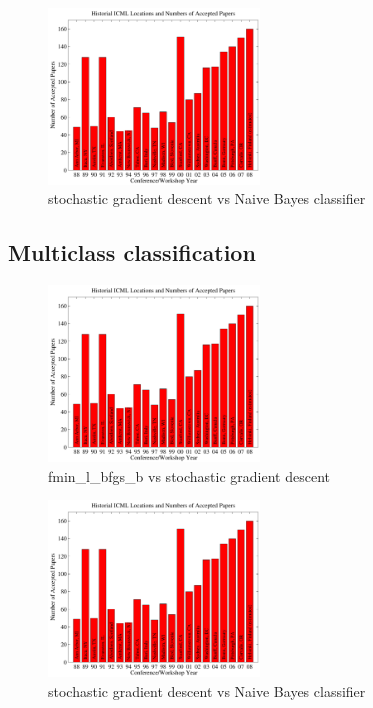 \documentclass{article}
\begin{document}
\begin{figure}[H]
  \caption{stochastic gradient descent vs Naive Bayes classifier}
  \centering
    \includegraphics[width=0.5\textwidth]{icml_numpapers}
\end{figure}



\subsection{Multiclass classification}
\begin{figure}[H]
  \caption{fmin\_l\_bfgs\_b vs stochastic gradient descent}
  \centering
    \includegraphics[width=0.5\textwidth]{icml_numpapers}
\end{figure}


\begin{figure}[H]
  \caption{stochastic gradient descent vs Naive Bayes classifier}
  \centering
    \includegraphics[width=0.5\textwidth]{icml_numpapers}
\end{figure}
\end{document}
